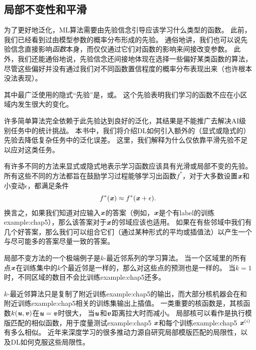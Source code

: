 
\subsection{局部不变性和平滑}
\label{sec:local_constancy_and_smoothness_regularization}
为了更好地泛化，\gls{ML}算法需要由先验信念引导应该学习什么类型的函数。
此前，我们已经看到过由模型参数的概率分布形成的先验。
通俗地讲，我们也可以说先验信念直接影响\emph{函数}本身，而仅仅通过它们对函数的影响来间接改变参数。 
此外，我们还能通俗地说，先验信念还间接地体现在选择一些偏好某类函数的算法，尽管这些偏好并没有通过我们对不同函数置信程度的概率分布表现出来（也许根本没法表现）。


其中最广泛使用的隐式``先验''是，或。
这个先验表明我们学习的函数不应在小区域内发生很大的变化。

许多简单算法完全依赖于此先验达到良好的泛化，其结果是不能推广去解决\gls{AI}级别任务中的统计挑战。
本书中，我们将介绍\gls{DL}如何引入额外的（显式或隐式的）先验去降低复杂任务中的泛化误差。
这里，我们解释为什么仅依靠平滑先验不足以应对这类任务。

有许多不同的方法来显式或隐式地表示学习函数应该具有光滑或局部不变的先验。
所有这些不同的方法都旨在鼓励学习过程能够学习出函数$f^*$，对于大多数设置$\boldsymbol{\mathit{x}}$和小变动$\epsilon$，都满足条件
\begin{equation}
    f^*(\boldsymbol{\mathit{x}}) \approx f^*(\boldsymbol{\mathit{x}} + \epsilon).
\end{equation}
换言之，如果我们知道对应输入$\boldsymbol{\mathit{x}}$的答案（例如，$\boldsymbol{\mathit{x}}$是个有\gls{label}的训练\gls{example:chap5}），那么该答案对于$\boldsymbol{\mathit{x}}$的邻域应该也适用。
如果在有些邻域中我们有几个好答案，那么我们可以组合它们（通过某种形式的平均或插值法）以产生一个与尽可能多的答案尽量一致的答案。

局部不变方法的一个极端例子是$k$-最近邻系列的学习算法。
当一个区域里的所有点$\boldsymbol{\mathit{x}}$在训练集中的$k$个最近邻是一样的，那么对这些点的预测也是一样的。
当$k=1$时，不同区域的数目不会比训练\gls{example:chap5}还多。

$k$-最近邻算法只是复制了附近训练\gls{example:chap5}的输出，而大部分核机器会在和附近训练\gls{example:chap5}相关的训练集输出上插值。
一类重要的核函数是，其核函数$k(\boldsymbol{\mathit{u}},\boldsymbol{\mathit{v}})$在$\boldsymbol{\mathit{u}}=\boldsymbol{\mathit{v}}$时很大，
当$\boldsymbol{\mathit{u}}$和$\boldsymbol{\mathit{v}}$距离拉大时而减小。
局部核可以看作是执行模版匹配的相似函数，用于度量测试\gls{example:chap5} $\boldsymbol{\mathit{x}}$和每个训练\gls{example:chap5} $\boldsymbol{\mathit{x}}^{(i)}$有多么相似。
近年来深度学习的很多推动力源自研究局部模版匹配的局限性，以及\gls{DL}如何克服这些局限性\citep{Bengio-localfailure-NIPS-2006-small}。


